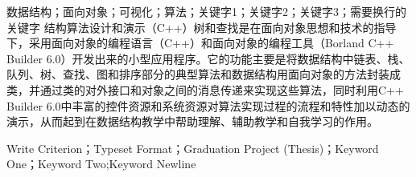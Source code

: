\documentclass[supercite]{upcthesis}
\begin{document}
\fi

\begin{cnabstract}{数据结构；面向对象；可视化；算法；关键字1；关键字2；关键字3；需要换行的关键字}
结构算法设计和演示（C++）树和查找是在面向对象思想和技术的指导下，采用面向对象的编程语言（C++）和面向对象的编程工具（Borland C++ Builder 6.0）开发出来的小型应用程序。它的功能主要是将数据结构中链表、栈、队列、树、查找、图和排序部分的典型算法和数据结构用面向对象的方法封装成类，并通过类的对外接口和对象之间的消息传递来实现这些算法，同时利用C++ Builder 6.0中丰富的控件资源和系统资源对算法实现过程的流程和特性加以动态的演示，从而起到在数据结构教学中帮助理解、辅助教学和自我学习的作用。
\end{cnabstract}


\begin{enabstract}{Write Criterion；Typeset Format；Graduation Project (Thesis)；Keyword One；Keyword Two;Keyword Newline}
\lipsum[10]
\end{enabstract}


\ifx\compileAllFiles\undefined
\end{document}
